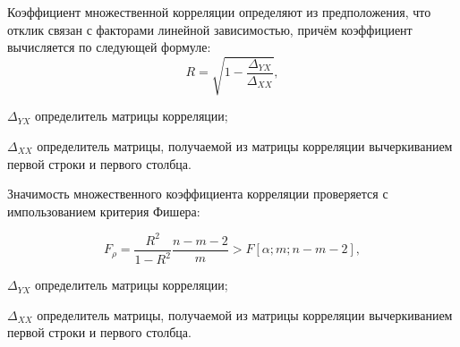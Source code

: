 Коэффициент множественной корреляции определяют из предположения, что отклик связан с факторами линейной зависимостью, причём коэффициент вычисляется по следующей формуле:
\begin{equation}
\label{eq:fuckMark}
R = \sqrt{1 - \frac{\Delta_{YX}}{\Delta_{XX}}},
\end{equation}
\begin{eqexpl}[15mm]
\item{$\Delta_{YX}$} определитель матрицы корреляции;
\item{$\Delta_{XX}$} определитель матрицы, получаемой из матрицы корреляции вычеркиванием первой строки и первого столбца.
\end{eqexpl}

Значимость множественного коэффициента корреляции проверяется с импользованием критерия Фишера:

\begin{equation}
\label{eq:fisherCrit}
F_\rho = \frac{R^2}{1-R^2} \frac{n - m - 2}{m} > F\left[{\alpha;m;n-m-2}\right] ,
\end{equation}
\begin{eqexpl}[15mm]
\item{$\Delta_{YX}$} определитель матрицы корреляции;
\item{$\Delta_{XX}$} определитель матрицы, получаемой из матрицы корреляции вычеркиванием первой строки и первого столбца.
\end{eqexpl}

\pagebreak